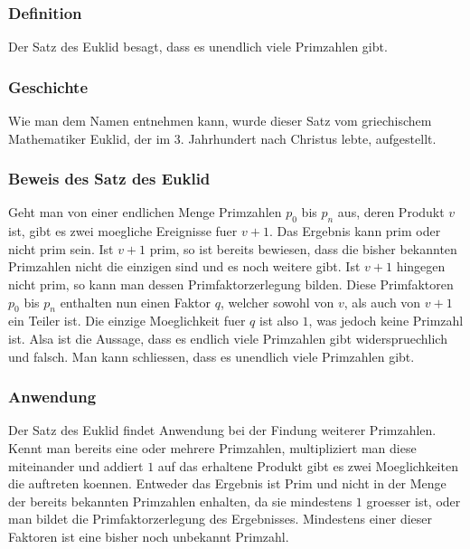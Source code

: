 \subsubsection{Definition}
Der Satz des Euklid besagt, dass es unendlich viele Primzahlen gibt.
\subsubsection{Geschichte}
Wie man dem Namen entnehmen kann, wurde dieser Satz vom griechischem Mathematiker Euklid, der im 3. Jahrhundert nach Christus lebte, aufgestellt.
\subsubsection{Beweis des Satz des Euklid}
Geht man von einer endlichen Menge Primzahlen $p_0$ bis $p_n$ aus, deren Produkt $v$ ist, gibt es zwei moegliche Ereignisse fuer $v + 1$. Das Ergebnis kann prim oder nicht prim sein. Ist $v + 1$ prim, so ist bereits bewiesen, dass die bisher bekannten Primzahlen nicht die einzigen sind und es noch weitere gibt. Ist $v + 1$ hingegen nicht prim, so kann man dessen Primfaktorzerlegung bilden. Diese Primfaktoren $p_0$ bis $p_n$ enthalten nun einen Faktor $q$, welcher sowohl von $v$, als auch von $v + 1$ ein Teiler ist. Die einzige Moeglichkeit fuer $q$ ist also $1$, was jedoch keine Primzahl ist. Alsa ist die Aussage, dass es endlich viele Primzahlen gibt widerspruechlich und falsch. Man kann schliessen, dass es unendlich viele Primzahlen gibt.
\subsubsection{Anwendung}
Der Satz des Euklid findet Anwendung bei der Findung weiterer Primzahlen. Kennt man bereits eine oder mehrere Primzahlen, multipliziert man diese miteinander und addiert $1$ auf das erhaltene Produkt gibt es zwei Moeglichkeiten die auftreten koennen. Entweder das Ergebnis ist Prim und nicht in der Menge der bereits bekannten  Primzahlen enhalten, da sie mindestens $1$ groesser ist, oder man bildet die Primfaktorzerlegung des Ergebnisses. Mindestens einer dieser Faktoren ist eine bisher noch unbekannt Primzahl.
